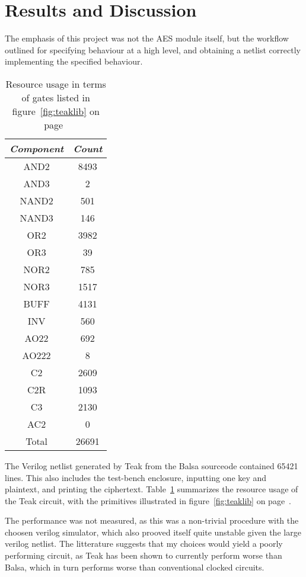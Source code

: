\section{Results and Discussion}

The emphasis of this project was not the AES module itself, but the
workflow outlined for specifying behaviour at a high level, and
obtaining a netlist correctly implementing the specified
behaviour.

\begin{table}[h]
  \centering
  \begin{tabular}{|c|c|}
    \hline
    \emph{Component}  & \emph{Count} \\ \hline
    AND2 & 8493 \\
    AND3 & 2 \\
    NAND2 & 501 \\
    NAND3 & 146 \\
    OR2 & 3982 \\
    OR3 & 39 \\
    NOR2 & 785 \\ 
    NOR3 & 1517 \\
    BUFF & 4131 \\
    INV & 560 \\
    AO22 & 692 \\
    AO222 & 8 \\
    C2 & 2609 \\
    C2R & 1093 \\
    C3  & 2130 \\
    AC2 & 0 \\ \hline
    Total & 26691 \\
    \hline
  \end{tabular}
  \caption{Resource usage in terms of gates listed in
    figure~\ref{fig:teaklib} on page~\pageref{fig:teaklib}}
  \label{tab:res}
\end{table}

The Verilog netlist generated by Teak from the Balsa sourceode
contained 65421 lines. This also includes the test-bench enclosure,
inputting one key and plaintext, and printing the
ciphertext. Table~\ref{tab:res} summarizes the resource usage of the
Teak circuit, with the primitives illustrated in
figure~\ref{fig:teaklib} on page~\pageref{fig:teaklib}.

The performance was not measured, as this was a non-trivial procedure
with the choosen verilog simulator, which also prooved itself quite
unstable given the large verilog netlist. The litterature suggests
that my choices would yield a poorly performing circuit, as Teak has
been shown to currently perform worse than Balsa, which in turn
performs worse than conventional clocked circuits.

